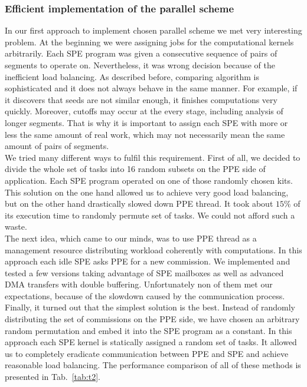 \documentclass[envcountsame,envcountchap]{svmono}
\begin{document}
\subsubsection{Efficient implementation of the parallel scheme}
In our first approach to implement chosen parallel scheme we met very
interesting problem.
At the beginning we were assigning jobs for the computational kernels
arbitrarily.
Each SPE program was given a consecutive sequence of pairs of segments to
operate on.
Nevertheless, it was wrong decision because of the inefficient load balancing.
As described before, comparing algorithm is sophisticated and it does not always
behave in the same manner.
For example, if it discovers that seeds are not similar enough, it finishes
computations very quickly.
Moreover, cutoffs may occur at the every stage, including analysis of longer
segments.
That is why it is important to assign each SPE with more or less the same
amount of real work, which may not necessarily mean the same amount of pairs of
segments.\\
We tried many different ways to fulfil this requirement.
First of all, we decided to divide the whole set of tasks into 16 random subsets
on the PPE side of application.
Each SPE program operated on one of those randomly chosen kits.
This solution on the one hand allowed us to achieve very good load balancing,
but on the other hand drastically slowed down PPE thread.
It took about $15\%$ of its execution time to randomly permute set of tasks.
We could not afford such a waste.\\
The next idea, which came to our minds, was to use PPE thread as a management
resource distributing workload coherently with computations.
In this approach each idle SPE asks PPE for a new commission.
We implemented and tested a few versions taking advantage of SPE mailboxes
as well as advanced DMA transfers with double buffering.
Unfortunately non of them met our expectations, because of the slowdown caused
by the communication process.\\
Finally, it turned out that the simplest solution is the best.
Instead of randomly distributing the set of commissions on the PPE side, we have
chosen an arbitrary random permutation and embed it into the SPE program as a
constant.
In this approach each SPE kernel is statically assigned a random set of tasks.
It allowed us to completely eradicate communication between PPE and SPE and
achieve reasonable load balancing.
The performance comparison of all of these methods is presented in
Tab.~\ref{tab:t2}.
\end{document}
